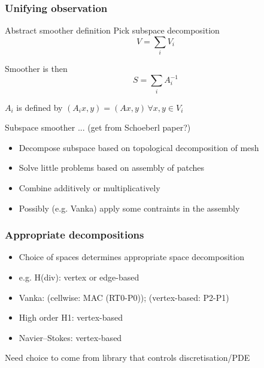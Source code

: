 \documentclass[presentation,aspectratio=43]{beamer}
\begin{document}
\begin{frame}
  \frametitle{Unifying observation}

  \begin{block}{Abstract smoother definition}
    Pick subspace decomposition
    \begin{equation*}
      V = \sum_i V_i
    \end{equation*}

    Smoother is then
    \begin{equation*}
      S = \sum_i A_i^{-1}
    \end{equation*}

    $A_i$ is defined by $(A_i x, y) = (A x, y) \, \forall x, y \in V_i$
  \end{block}

  \begin{block}{Subspace smoother}
    ... (get from Schoeberl paper?)
  \end{block}
  \begin{itemize}
  \item Decompose subspace based on topological decomposition of mesh
  \item Solve little problems based on assembly of patches
  \item Combine additively or multiplicatively
  \item Possibly (e.g. Vanka) apply some contraints in the assembly
  \end{itemize}
\end{frame}

\begin{frame}
  \frametitle{Appropriate decompositions}
  \begin{itemize}
  \item Choice of spaces determines appropriate space decomposition
  \item e.g. H(div): vertex or edge-based
  \item Vanka: (cellwise: MAC (RT0-P0)); (vertex-based: P2-P1)
  \item High order H1: vertex-based
  \item Navier--Stokes: vertex-based
  \end{itemize}
  \begin{corollary}
    Need choice to come from library that controls discretisation/PDE
  \end{corollary}
\end{frame}
\end{document}
